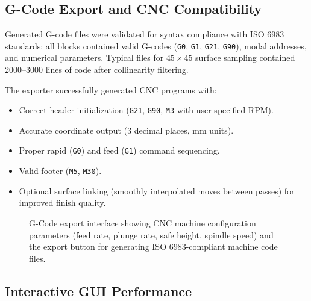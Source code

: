 \documentclass[a4paper,12pt]{article}
\begin{document}

\subsection{G-Code Export and CNC Compatibility}

Generated G-code files were validated for syntax compliance with ISO 6983
standards: all blocks contained valid G-codes (\texttt{G0}, \texttt{G1},
\texttt{G21}, \texttt{G90}), modal addresses, and numerical parameters. Typical
files for $45 \times 45$ surface sampling contained 2000--3000 lines of code
after collinearity filtering.

The exporter successfully generated CNC programs with:
\begin{itemize}
  \item Correct header initialization (\texttt{G21}, \texttt{G90}, \texttt{M3}
    with user-specified RPM).
  \item Accurate coordinate output (3 decimal places, mm units).
  \item Proper rapid (\texttt{G0}) and feed (\texttt{G1}) command sequencing.
  \item Valid footer (\texttt{M5}, \texttt{M30}).
  \item Optional surface linking (smoothly interpolated moves between passes)
    for improved finish quality.
\end{itemize}

\begin{figure}[H]
  \centering
  \caption{G-Code export interface showing CNC machine configuration parameters
           (feed rate, plunge rate, safe height, spindle speed) and the export
           button for generating ISO 6983-compliant machine code files.}
  \label{fig:gcode_export_gui}
\end{figure}

\subsection{Interactive GUI Performance}
\end{document}
